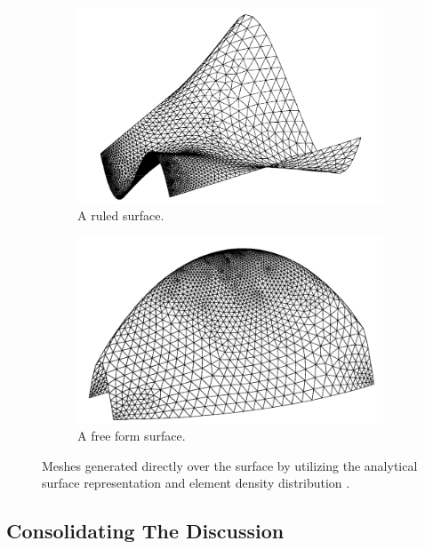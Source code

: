 \begin{figure}
	\centering
	\begin{subfigure}{0.5\linewidth}
		\centering
		\includegraphics[width=\linewidth]{img/intro/lit/lu1.png}
		\caption{A ruled surface.}
		\label{fig-lu1}
	\end{subfigure}
	\begin{subfigure}{0.5\linewidth}
		\centering
		\includegraphics[width=\linewidth]{img/intro/lit/lu2.png}
		\caption{A free form surface.}
		\label{fig-lu2}
	\end{subfigure}
	\caption{Meshes generated directly over the surface by utilizing the analytical surface representation and element density distribution \cite{lan1996finite}.}
	\label{fig-lu}
\end{figure}


\subsection{Consolidating The Discussion}
\label{consolidate-motivation}

